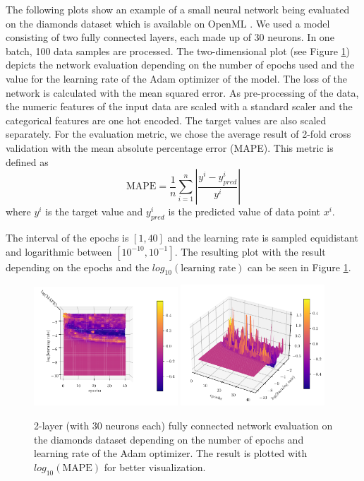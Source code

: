 The following plots show an example of a small neural network being evaluated on the diamonds dataset which is available on OpenML \cite{feurer-arxiv19a}. We used a model consisting of two fully connected layers, each made up of 30 neurons. In one batch, 100 data samples are processed. The two-dimensional plot (see Figure \ref{fig:analysis_model_training}) depicts the network evaluation depending on the number of epochs used and the value for the learning rate of the Adam optimizer of the model. The loss of the network is calculated with the mean squared error. As pre-processing of the data, the numeric features of the input data are scaled with a standard scaler and the categorical features are one hot encoded. The target values are also scaled separately. For the evaluation metric, we chose the average result of 2-fold cross validation with the mean absolute percentage error (MAPE). This metric is defined as 
\begin{equation}
 	\text{MAPE} = \frac{1}{n} \sum_{i=1}^{n}\left|\frac{y^i - y^i_{pred}}{y^i}\right|
\end{equation}
where $ y^i $ is the target value and $ y^i_{pred} $ is the predicted value of data point $ x^i $.

The interval of the epochs is $ [1, 40] $ and the learning rate is sampled equidistant and logarithmic between $ [10^{-10}, 10^{-1}] $. The resulting plot with the result depending on the epochs and the $ log_{10}(\text{learning rate}) $ can be seen in Figure \ref{fig:analysis_model_training}.

\begin{figure}[H]
	\centering
	\includegraphics[width=0.48\textwidth]{figures/Results/Machine_learning/1000_evaluations/Network_above}
	\includegraphics[width=0.48\textwidth]{figures/Results/Machine_learning/1000_evaluations/Network_normal}
	
	\caption{ 2-layer (with 30 neurons each) fully connected network evaluation on the diamonds dataset depending on the number of epochs and learning rate of the Adam optimizer. The result is plotted with $ log_{10}(\text{MAPE}) $ for better visualization. }
	\label{fig:analysis_model_training}
\end{figure}


